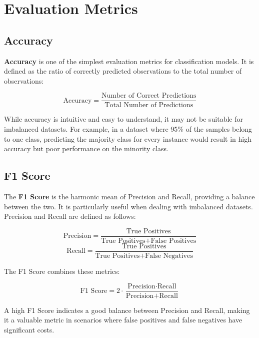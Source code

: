 \documentclass{article}%
\begin{document}
%
\newpage%
\section{Evaluation Metrics}%
\label{sec:EvaluationMetrics}%
\subsection{Accuracy}%
\label{subsec:Accuracy}%

                \textbf{Accuracy} is one of the simplest evaluation metrics for classification models. 
                It is defined as the ratio of correctly predicted observations to the total number of observations:

                \[
                \text{Accuracy} = \frac{\text{Number of Correct Predictions}}{\text{Total Number of Predictions}}
                \]

                While accuracy is intuitive and easy to understand, it may not be suitable for imbalanced datasets. 
                For example, in a dataset where 95\% of the samples belong to one class, predicting the majority class for every instance 
                would result in high accuracy but poor performance on the minority class.
                

%
\subsection{F1 Score}%
\label{subsec:F1Score}%

                The \textbf{F1 Score} is the harmonic mean of Precision and Recall, providing a balance between the two. 
                It is particularly useful when dealing with imbalanced datasets. Precision and Recall are defined as follows:

                \[
                \text{Precision} = \frac{\text{True Positives}}{\text{True Positives} + \text{False Positives}}
                \]
                \[
                \text{Recall} = \frac{\text{True Positives}}{\text{True Positives} + \text{False Negatives}}
                \]

                The F1 Score combines these metrics:

                \[
                \text{F1 Score} = 2 \cdot \frac{\text{Precision} \cdot \text{Recall}}{\text{Precision} + \text{Recall}}
                \]

                A high F1 Score indicates a good balance between Precision and Recall, making it a valuable metric in scenarios where false positives 
                and false negatives have significant costs.
                
\end{document}
